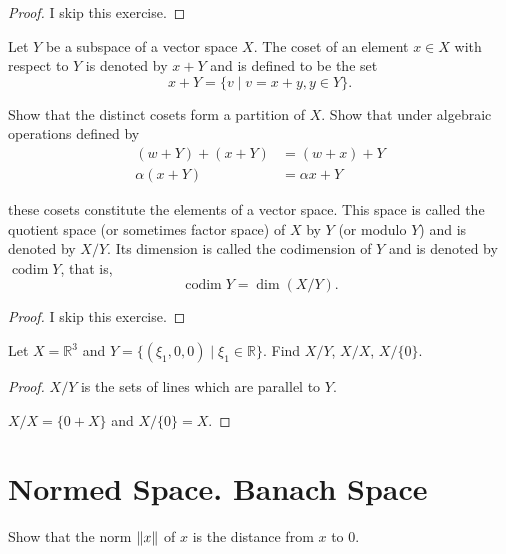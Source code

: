 \begin{proof}
    I skip this exercise.
\end{proof}

\begin{exercise}\label{chapter2:section1:exercise14}
    Let $Y$ be a subspace of a vector space $X$. The coset of an element $x\in X$ with respect to $Y$ is denoted by $x + Y$ and is defined to be the set
    \[
        x + Y = \{ v \mid v = x + y, y\in Y \}.
    \]

    Show that the distinct cosets form a partition of $X$. Show that under algebraic operations defined by
    \begin{align*}
        (w + Y) + (x + Y) & = (w + x) + Y  \\
        \alpha (x + Y)    & = \alpha x + Y
    \end{align*}

    these cosets constitute the elements of a vector space. This space is called the quotient space (or sometimes factor space) of $X$ by $Y$ (or modulo $Y$) and is denoted by $X/Y$. Its dimension is called the codimension of $Y$ and is denoted by $\operatorname{codim} Y$, that is,
    \[
        \operatorname{codim} Y = \dim (X/Y).
    \]
\end{exercise}

\begin{proof}
    I skip this exercise.
\end{proof}

\begin{exercise}\label{chapter2:section1:exercise15}
    Let $X = \mathbb{R}^{3}$ and $Y = \{ (\xi_{1}, 0, 0) \mid \xi_{1}\in\mathbb{R} \}$. Find $X/Y$, $X/X$, $X/\{0\}$.
\end{exercise}

\begin{proof}
    $X/Y$ is the sets of lines which are parallel to $Y$.

    $X/X = \{ 0 + X \}$ and $X/\{ 0 \} = X$.
\end{proof}

\section{Normed Space. Banach Space}

\begin{exercise}\label{chapter2:section2:exercise1}
    Show that the norm $\left\Vert{x}\right\Vert$ of $x$ is the distance from $x$ to $0$.
\end{exercise}

